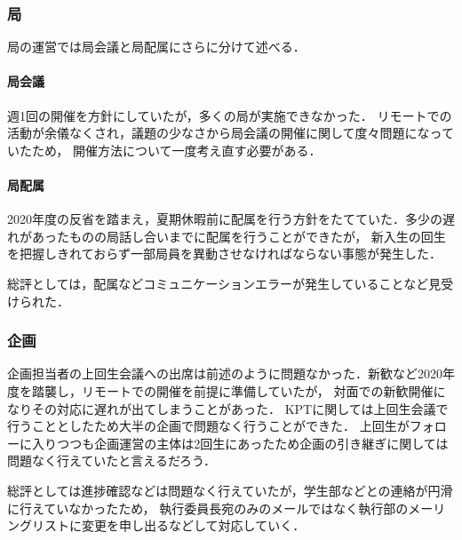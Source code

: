\subsubsection*{局}
局の運営では局会議と局配属にさらに分けて述べる．
\paragraph*{局会議}
週1回の開催を方針にしていたが，多くの局が実施できなかった．
リモートでの活動が余儀なくされ，議題の少なさから局会議の開催に関して度々問題になっていたため，
開催方法について一度考え直す必要がある．
\paragraph*{局配属}
2020年度の反省を踏まえ，夏期休暇前に配属を行う方針をたてていた．多少の遅れがあったものの局話し合いまでに配属を行うことができたが，
新入生の回生を把握しきれておらず一部局員を異動させなければならない事態が発生した．

総評としては，配属などコミュニケーションエラーが発生していることなど見受けられた．

\subsubsection*{企画}
企画担当者の上回生会議への出席は前述のように問題なかった．新歓など2020年度を踏襲し，リモートでの開催を前提に準備していたが，
対面での新歓開催になりその対応に遅れが出てしまうことがあった．
KPTに関しては上回生会議で行うこととしたため大半の企画で問題なく行うことができた．
上回生がフォローに入りつつも企画運営の主体は2回生にあったため企画の引き継ぎに関しては問題なく行えていたと言えるだろう．

総評としては進捗確認などは問題なく行えていたが，学生部などとの連絡が円滑に行えていなかったため，
執行委員長宛のみのメールではなく執行部のメーリングリストに変更を申し出るなどして対応していく．